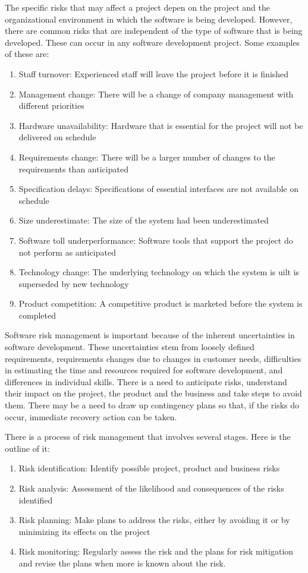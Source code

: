 The specific risks that may affect a project depen on the project and the organizational environment in which the software is being developed. However, there are common risks that are independent of the type of software that is being developed. These can occur in any software development project. Some examples of these are:
\begin{enumerate}
    \item Staff turnover: Experienced staff will leave the project before it is finished
    \item Management change: There will be a change of company management with different priorities
    \item Hardware unavailability: Hardware that is essential for the project will not be delivered on schedule
    \item Requirements change: There will be a larger number of changes to the requirements than anticipated
    \item Specification delays: Specifications of essential interfaces are not available on schedule
    \item Size underestimate: The size of the system had been underestimated
    \item Software toll underperformance: Software tools that support the project do not perform as anticipated
    \item Technology change: The underlying technology on which the system is uilt is superseded by new technology
    \item Product competition: A competitive product is marketed before the system is completed
\end{enumerate}

Software risk management is important because of the inherent uncertainties in software development. These uncertainties stem from loosely defined requirements, requirements changes due to changes in customer needs, difficulties in estimating the time and resources required for software development, and differences in individual skills. There is a need to anticipate risks, understand their impact on the project, the product and the business and take steps to avoid them. There may be a need to draw up contingency plans so that, if the risks do occur, immediate recovery action can be taken.

There is a process of risk management that involves several stages. Here is the outline of it:
\begin{enumerate}
    \item Risk identification: Identify possible project, product and business risks
    \item Risk analysis: Assessment of the likelihood and consequences of the risks identified
    \item Risk planning: Make plans to address the risks, either by avoiding it or by minimizing its effects on the project
    \item Risk monitoring: Regularly assess the risk and the plans for risk mitigation and revise the plans when more is known about the risk.
\end{enumerate}

